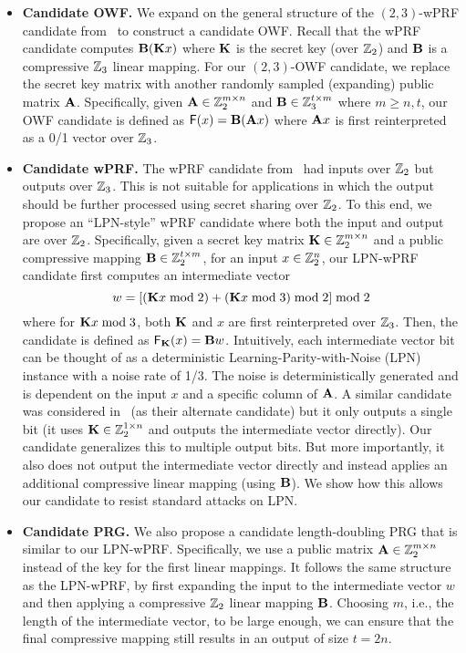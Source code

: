 \begin{itemize}
    \item \textbf{Candidate OWF.} 
    We expand on the general structure of the $(2,3)$-wPRF candidate from~\cite{boneh2018-darkmatter} to construct a candidate OWF. Recall that the wPRF candidate computes $\mat{B}(\mat{K}x)$ where $\mat{K}$ is the secret key (over $\mathbb{Z}_2$) and $\mat{B}$ is a compressive $\mathbb{Z}_3$ linear mapping. For our $(2,3)$-OWF candidate, we replace the secret key matrix with another randomly sampled (expanding) public matrix $\mat{A}$. Specifically, given $\mat{A} \in \Z_2^{m \times n}$ and $\mat{B} \in \Z_3^{t \times m}$ where $m \geq n,t$, our OWF candidate is defined as $\mathsf{F}(x) = \mat{B}(\mat{A}x)$ where $\mat{A}x$ is first reinterpreted as a 0/1 vector over $\mathbb{Z}_3$.

    \item \textbf{Candidate wPRF.}
    The wPRF candidate from~\cite{boneh2018-darkmatter} had inputs over $\mathbb{Z}_2$ but outputs over $\mathbb{Z}_3$. This is not suitable for applications in which the output should be further processed using secret sharing over $\mathbb{Z}_2$. To this end, we propose an ``LPN-style'' wPRF candidate where both the input and output are over $\mathbb{Z}_2$. Specifically, given a secret key matrix $\mat{K} \in \Z_2^{m \times n}$ and a public compressive mapping $\mat{B} \in \Z_2^{t \times m}$, for an input $x \in \mathbb{Z}_2^n$, our LPN-wPRF candidate first computes an intermediate vector
    \[
        w = [(\mat{K}x \bmod 2) + (\mat{K}x \bmod 3) \bmod 2] \bmod 2
    \]
    where for $\mat{K}x \bmod 3$, both $\mat{K}$ and $x$ are first reinterpreted over $\mathbb{Z}_3$. Then, the candidate is defined as $\mathsf{F}_\mat{K}(x) = \mat{B}w$. Intuitively, each intermediate vector bit can be thought of as a deterministic Learning-Parity-with-Noise (LPN) instance with a noise rate of 1/3. The noise is deterministically generated and is dependent on the input $x$ and a specific column of $\mat{A}$. A similar candidate was considered in~\cite{boneh2018-darkmatter} (as their alternate candidate) but it only outputs a single bit (it uses $\mat{K} \in \Z_2^{1 \times n}$ and outputs the intermediate vector directly). Our candidate generalizes this to multiple output bits. But more importantly, it also does not output the intermediate vector directly and instead applies an additional compressive linear mapping (using $\mat{B}$). We show how this allows our candidate to resist standard attacks on LPN.


    \item \textbf{Candidate PRG.}
    We also propose a candidate length-doubling PRG that is similar to our LPN-wPRF. Specifically, we use a public matrix $\mat{A} \in \Z_2^{m \times n}$ instead of the key for the first linear mappings. It follows the same structure as the LPN-wPRF, by first expanding the input to the intermediate vector $w$ and then applying a compressive $\mathbb{Z}_2$ linear mapping $\mat{B}$. Choosing $m$, i.e., the length of the intermediate vector, to be large enough, we can ensure that the final compressive mapping still results in an output of size $t = 2n$.


\end{itemize}

